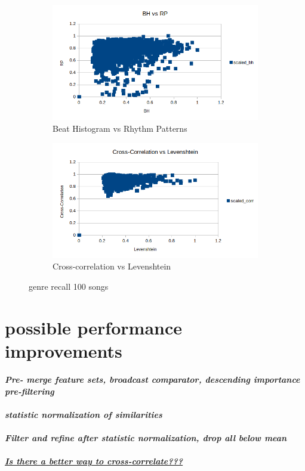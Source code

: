 \begin{figure}[htbp]
{{			\begin{subfigure}{.495\textwidth}
				\centering    
				\includegraphics[scale=0.5]{Images/SparkFeat/BH_RP.png}
				\caption{Beat Histogram vs Rhythm Patterns}
				\label{fs3}
			\end{subfigure}
			\begin{subfigure}{.495\textwidth}
				\centering     
				\includegraphics[scale=0.5]{Images/SparkFeat/Cross-Corr_Levenshtein.png}
				\caption{Cross-correlation vs Levenshtein}
				\label{fs4}
			\end{subfigure}%
	}}
	\caption{genre recall 100 songs}
	\label{fig:featsep}
\end{figure}


\section{possible performance improvements}

\textit{\textbf{Pre- merge feature sets, broadcast comparator, descending importance pre-filtering\\}}
\\
\textit{\textbf{statistic normalization of similarities\\}}
\ \\
\textit{\textbf{Filter and refine after statistic normalization, drop all below mean\\}}
\ \\
\textit{\textbf{\underline{Is there a better way to cross-correlate???}\\}}
\ \\
